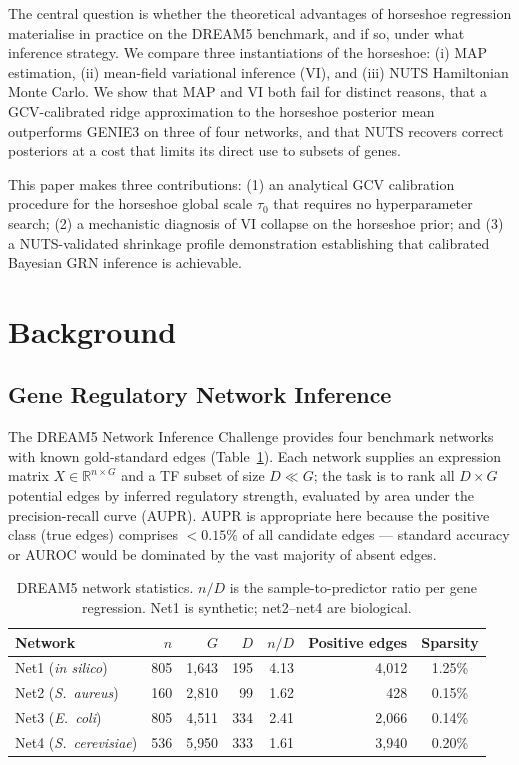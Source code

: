 \documentclass[11pt]{article}
\begin{document}
The central question is whether the theoretical advantages of horseshoe regression
materialise in practice on the DREAM5 benchmark, and if so, under what inference strategy.
We compare three instantiations of the horseshoe: (i) MAP estimation, (ii) mean-field
variational inference (VI), and (iii) NUTS Hamiltonian Monte Carlo. We show that MAP and
VI both fail for distinct reasons, that a GCV-calibrated ridge approximation to the
horseshoe posterior mean outperforms GENIE3 on three of four networks, and that NUTS
recovers correct posteriors at a cost that limits its direct use to subsets of genes.

This paper makes three contributions: (1) an analytical GCV calibration procedure for the
horseshoe global scale $\tau_0$ that requires no hyperparameter search; (2) a mechanistic
diagnosis of VI collapse on the horseshoe prior; and (3) a NUTS-validated shrinkage
profile demonstration establishing that calibrated Bayesian GRN inference is achievable.

\section{Background}

\subsection{Gene Regulatory Network Inference}

The DREAM5 Network Inference Challenge \citep{marbach2012} provides four benchmark
networks with known gold-standard edges (Table~\ref{tab:networks}).
Each network supplies an expression matrix $X \in \mathbb{R}^{n \times G}$ and a TF
subset of size $D \ll G$; the task is to rank all $D \times G$ potential edges by
inferred regulatory strength, evaluated by area under the precision-recall curve (AUPR).
AUPR is appropriate here because the positive class (true edges) comprises $< 0.15\%$
of all candidate edges --- standard accuracy or AUROC would be dominated by the vast
majority of absent edges.

\begin{table}[h]
\centering
\caption{DREAM5 network statistics. $n/D$ is the sample-to-predictor ratio per gene
regression. Net1 is synthetic; net2--net4 are biological.}
\label{tab:networks}
\begin{tabular}{lrrrrrc}
\toprule
Network & $n$ & $G$ & $D$ & $n/D$ & Positive edges & Sparsity \\
\midrule
Net1 (\textit{in silico})   & 805 & 1{,}643 & 195 & 4.13 & 4{,}012 & 1.25\% \\
Net2 (\textit{S.~aureus})   & 160 & 2{,}810 &  99 & 1.62 &    428  & 0.15\% \\
Net3 (\textit{E.~coli})     & 805 & 4{,}511 & 334 & 2.41 & 2{,}066 & 0.14\% \\
Net4 (\textit{S.~cerevisiae}) & 536 & 5{,}950 & 333 & 1.61 & 3{,}940 & 0.20\% \\
\bottomrule
\end{tabular}
\end{table}
\end{document}
